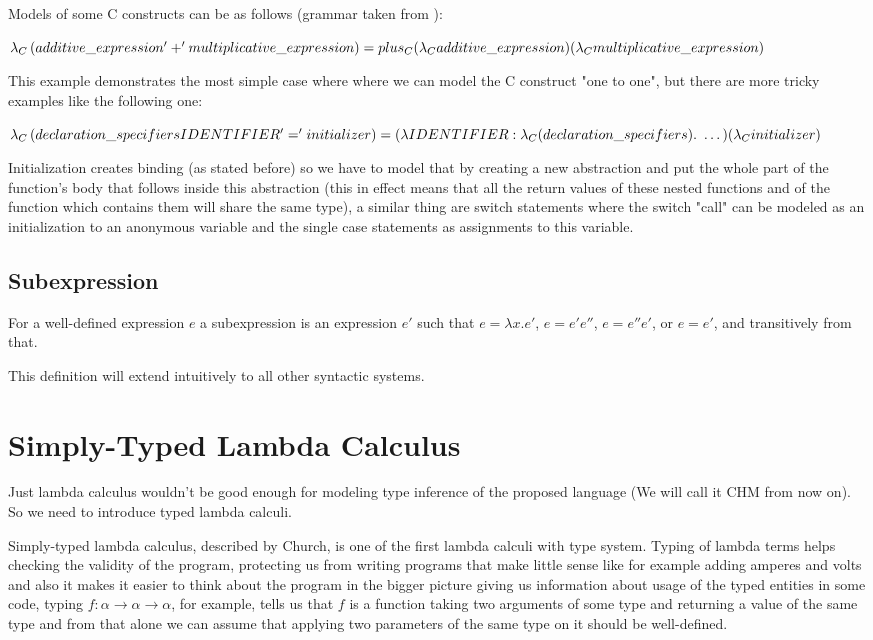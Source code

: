 Models of some C constructs can be as follows (grammar taken from ): %

$\lambda_C\left(additive\_expression '+' multiplicative\_expression\right) = \\ plus_C (\lambda_C additive\_expression) (\lambda_C multiplicative\_expression)$

This example demonstrates the most simple case where  where we can model the C construct "one to one",
but there are more tricky examples like the following one:

$\lambda_C\left(declaration\_specifiers IDENTIFIER '=' initializer\right) = \\ (\lambda IDENTIFIER : \lambda_C(declaration\_specifiers) .\ \dots) (\lambda_C initializer)$

Initialization creates binding (as stated before) so we have to model that by creating a new abstraction and put the whole
part of the function's body that follows inside this abstraction (this in effect means that all the return values of these nested functions
and of the function which contains them will share the same type), a similar thing are switch statements where the switch "call" can be modeled
as an initialization to an anonymous variable and the single case statements as assignments to this variable.

\subsection{Subexpression}

For a well-defined expression $e$ a subexpression is an expression $e'$ such that $e = \lambda x . e'$, $e = e' e''$, $e = e'' e'$, or $e = e'$, and transitively from that.

This definition will extend intuitively to all other syntactic systems.

\section{Simply-Typed Lambda Calculus}

Just lambda calculus wouldn't be good enough for modeling type inference of the proposed language (We will call it CHM from now on).
So we need to introduce typed lambda calculi.

Simply-typed lambda calculus, described by Church, is one of the first %
lambda calculi with type system. Typing of lambda terms helps checking the validity of the program, protecting us from writing
programs that make little sense like for example adding amperes and volts %
and also it makes it easier to think about the program in the bigger picture giving us information about usage of the typed entities
in some code, typing $f : \alpha \rightarrow \alpha \rightarrow \alpha$, for example, tells us that $f$ is a function taking two arguments
of some type and returning a value of the same type and from that alone we can assume that applying two parameters of the same type on it
should be well-defined.

